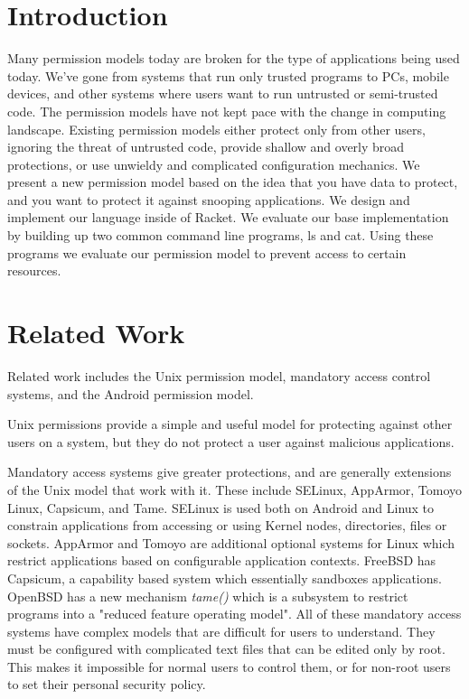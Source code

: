 \section{Introduction}\label{section:Introduction}
Many permission models today are broken for the type of applications being used today. We've gone from systems that run only trusted programs to PCs, mobile devices, and other systems where users want to run untrusted or semi-trusted code. The permission models have not kept pace with the change in computing landscape. Existing permission models either protect only from other users, ignoring the threat of untrusted code, provide shallow and overly broad protections, or use unwieldy and complicated configuration mechanics. We present a new permission model based on the idea that you have data to protect, and you want to protect it against snooping applications. We design and implement our language inside of Racket\cite{racket}. We evaluate our base implementation by building up two common command line programs, ls and cat. Using these programs we evaluate our permission model to prevent access to certain resources.

\section{Related Work}\label{section:relatedwork}
Related work includes the Unix permission model, mandatory access control systems, and the Android permission model.

Unix permissions provide a simple and useful model for protecting against other users on a system, but they do not protect a user against malicious applications.

Mandatory access systems give greater protections, and are generally extensions of the Unix model that work with it.  These include SELinux, AppArmor, Tomoyo Linux, Capsicum, and Tame.
SELinux is used both on Android and Linux to constrain applications from accessing or using Kernel nodes, directories, files or sockets. 
AppArmor and Tomoyo\cite{tomoyo} are additional optional systems for Linux which restrict applications based on configurable application contexts.
FreeBSD has Capsicum, a capability based system which essentially sandboxes applications. 
OpenBSD has a new mechanism \textit{tame()} which is a subsystem  to restrict programs into a "reduced feature operating model".
All of these mandatory access systems have complex models that are difficult for users to understand.  
They must be configured with complicated text files that can be edited only by root.  
This makes it impossible for normal users to control them, or for non-root users to set their personal security policy.

